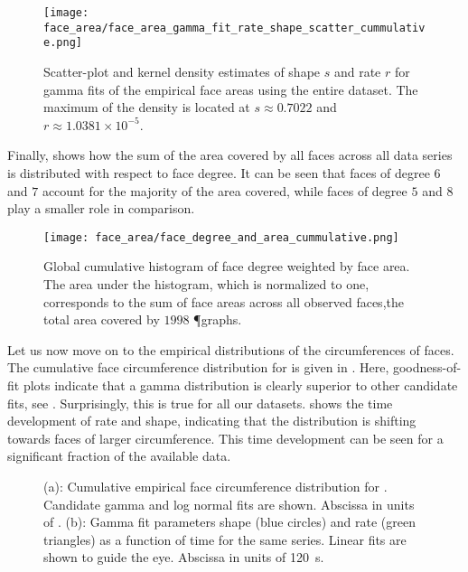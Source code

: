		\begin{figure}[!htbp]
			\centering
				\texttt{[image: face\_area/face\_area\_gamma\_fit\_rate\_shape\_scatter\_cummulative.png]}
			\caption[Face area distribution - Fit parameter densities]{Scatter-plot and kernel density estimates of shape $s$ and rate $r$ for gamma fits of the empirical face areas using the entire dataset. The maximum of the density is located at $s \approx 0.7022$ and $r \approx 1.0381 \times 10^{-5}$.}
			\label{fig:face_area_kde}
		\end{figure}

		Finally,  shows how the sum of the area covered by all faces across all data series is distributed with respect to face degree. It can be seen that faces of degree $6$ and $7$ account for the majority of the area covered, while faces of degree $5$ and $8$ play a smaller role in comparison. 

		\begin{figure}[!htbp]
			\centering
				\texttt{[image: face\_area/face\_degree\_and\_area\_cummulative.png]}
			\caption[Face degree weighted by face area]{Global cumulative histogram of face degree weighted by face area. The area under the histogram, which is normalized to one, corresponds to the sum of face areas across all observed faces,\ie the total area covered by $1998$ \P graphs.}
			\label{fig:face_degree_per_area}
		\end{figure}

		Let us now move on to the empirical distributions of the circumferences of faces. The cumulative face circumference distribution for  is given in . Here, goodness-of-fit plots indicate that a gamma distribution is clearly superior to other candidate fits, see . Surprisingly, this is true for all our datasets.  shows the time development of rate and shape, indicating that the distribution is shifting towards faces of larger circumference. This time development can be seen for a significant fraction of the available data.

		\begin{figure}
			\centering
			\qquad

			\caption[Face circumference distribution]{(a): Cumulative empirical face circumference distribution for . Candidate gamma and log normal fits are shown. Abscissa in units of \si{\pixel}. (b): Gamma fit parameters shape (blue circles) and rate (green triangles) as a function of time for the same series. Linear fits are shown to guide the eye. Abscissa in units of \SI{120}{\second}.}
			\label{fig:face_length_fit}
		\end{figure}

